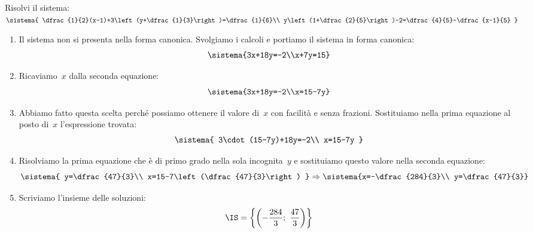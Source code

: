 \begin{esempio}{}{}
Risolvi il sistema: \quad 
\(\sistema{
  \dfrac{1}{2}(x-1)+3\left(y+\dfrac{1}{3}\right)=\dfrac{1}{6}\\
  y\left(1+\dfrac{2}{5}\right)-2=\dfrac{4}{5}-\dfrac{x-1}{5}
  }\)

\medskip
\begin{enumerate}[nosep, left=0mm]
\item Il sistema non si presenta nella forma canonica. 
Svolgiamo i calcoli e portiamo il sistema in forma canonica:\\[-.5em]
\[\sistema{3x+18y=-2\\x+7y=15}\]

\item Ricaviamo~\(x\) dalla seconda equazione:%
\[\sistema{3x+18y=-2\\x=15-7y}\]

\item Abbiamo fatto questa scelta perché possiamo ottenere il valore 
di~\(x\) con facilità e senza frazioni. 
Sostituiamo nella prima equazione al posto 
di~\(x\) l'espressione trovata:
\[\sistema{
          3\cdot(15-7y)+18y=-2\\
          x=15-7y
          }
\]
\item Risolviamo la prima equazione che è di primo grado nella sola
incognita~\(y\) e sostituiamo questo valore nella seconda equazione:
\[\sistema{
          y=\dfrac{47}{3}\\
          x=15-7\left(\dfrac{47}{3}\right)
          }
\Rightarrow \sistema{x=-\dfrac{284}{3}\\
 y=\dfrac{47}{3}}\]
\item Scriviamo l'insieme delle soluzioni:
\[\IS=\left\{\left(-\frac{284}{3};~\frac{47}{3}\right)\right\}\]
\end{enumerate}

 \end{esempio}
% 
% 
